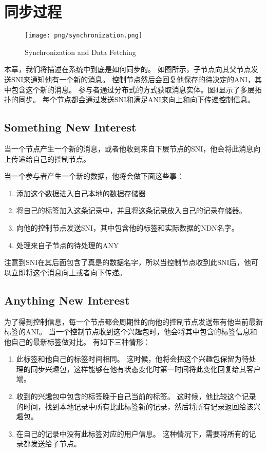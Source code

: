 \section{同步过程}

\begin{figure}
\centering
\texttt{[image: png/synchronization.png]}
\caption{Synchronization and Data Fetching}
\label{synchronization}
\end{figure}


本章，我们将描述在系统中到底是如何同步的。
如图所示，子节点向其父节点发送SNI来通知他有一个新的消息。
控制节点然后会回复他保存的待决定的ANI，其中包含这个新的消息。
参与者通过分布式的方式获取消息实体。图4显示了多层拓扑的同步。
每个节点都会通过发送SNI和满足ANI来向上和向下传递控制信息。

\subsection{Something New Interest}
当一个节点产生一个新的消息，或者他收到来自下层节点的SNI，他会将此消息向上传递给自己的控制节点。

当一个参与者产生一个新的数据，他将会做下面这些事：
\begin{enumerate}
  \item 添加这个数据进入自己本地的数据存储器
  \item 将自己的标签加入这条记录中，并且将这条记录放入自己的记录存储器。
  \item 向他的控制节点发送SNI，其中包含他的标签和实际数据的NDN名字。
  \item 处理来自子节点的待处理的ANY
\end{enumerate}

注意到SNI在其后面包含了真是的数据名字，所以当控制节点收到此SNI后，他可以立即将这个消息向上或者向下传递。

\subsection{Anything New Interest}
为了得到控制信息，每一个节点都会周期性的向他的控制节点发送带有他当前最新标签的ANI。
当一个控制节点收到这个兴趣包时，他会将其中包含的标签信息和他自己的最新标签做对比。
有如下三种情形：
\begin{enumerate}
  \item 此标签和他自己的标签时间相同。
这时候，他将会把这个兴趣包保留为待处理的同步兴趣包，这样能够在他有状态变化时第一时间将此变化回复给其客户端。
  \item 收到的兴趣包中包含的标签晚于自己当前的标签。
这时候，他比较这个记录的时间，找到本地记录中所有比此标签新的记录，然后将所有记录返回给该兴趣包。
  \item 在自己的记录中没有此标签对应的用户信息。
这种情况下，需要将所有的记录都发送给子节点。
\end{enumerate}


